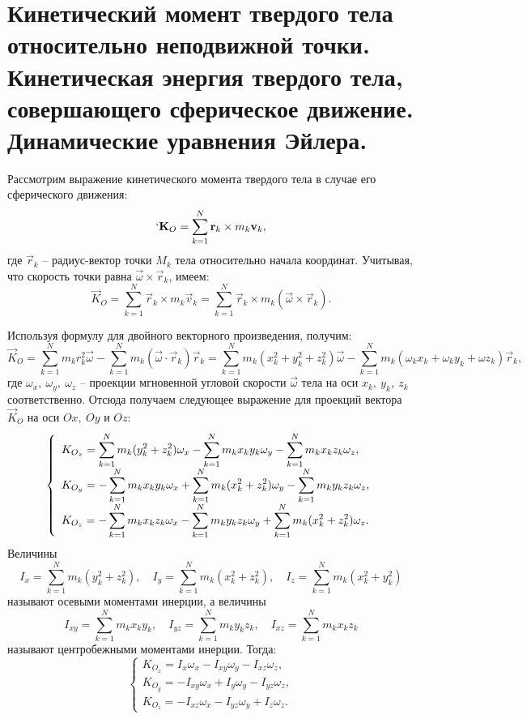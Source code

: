 \chapter{Кинетический момент твердого тела относительно неподвижной точки.
Кинетическая энергия твердого тела, совершающего сферическое движение.
Динамические уравнения Эйлера.}

Рассмотрим выражение кинетического момента твердого тела в случае его
сферического движения:
\[
`\vec{K}_O = \sum_{k=1}^N\vec{r}_k\times m_k\vec{v}_k,
\]
где \( \vec{r}_k \) -- радиус-вектор точки \( M_k \) тела относительно начала
координат. Учитывая, что скорость точки равна \( \vec{\omega}\times\vec{r}_k \),
имеем:
\[
    \vec{K}_O = \sum_{k=1}^N\vec{r}_k\times m_k\vec{v}_k =
    \sum_{k=1}^N \vec{r}_k\times m_k(\vec{\omega}\times\vec{r}_k).
\]

Используя формулу для двойного векторного произведения, получим:
\[
    \vec{K}_O = \sum_{k=1}^N m_k r_k^2\vec{\omega} - \sum_{k=1}^N m_k
    (\vec{\omega}\cdot\vec{r}_k)\vec{r}_k = \sum_{k=1}^N m_k(x_k^2 + y_k^2 +
    z_k^2)\vec{\omega} - \sum_{k=1}^N m_k (\omega_k x_k + \omega_k y_k + \omega
    z_k)\vec{r}_k,
\]
где \( \omega_x,\ \omega_y,\ \omega_z \) -- проекции мгновенной угловой скорости
\( \vec{\omega} \) тела на оси \( x_k,\ y_k,\ z_k \) соответственно. Отсюда
получаем следующее выражение для проекций вектора \( \vec{K}_O \) на оси
\( Ox,\ Oy \) и \( Oz \):
\[
    \left\{ \begin{array}{l}
        \ds K_{O_x} = \sum_{k=1}^N m_k(y_k^2 + z_k^2)\omega_x - \sum_{k=1}^N m_k
        x_k y_k \omega_y - \sum_{k=1}^N m_k x_k z_k \omega_z, \\[.4em]
        \ds K_{O_y} = -\sum_{k=1}^N m_k x_k y_k \omega_x + \sum_{k=1}^N m_k
        (x_k^2 + z_k^2)\omega_y  - \sum_{k=1}^N m_k y_k z_k \omega_z, \\[.4em]
        \ds K_{O_z} = -\sum_{k=1}^N m_k x_k z_k \omega_x - \sum_{k=1}^N m_k y_k
        z_k \omega_y + \sum_{k=1}^N m_k (x_k^2 + z_k^2)\omega_z.
    \end{array} \right.
\]
Величины
\[
    I_x = \sum_{k=1}^N m_k(y_k^2 + z_k^2), \quad I_y = \sum_{k=1}^N m_k(x_k^2 +
    z_k^2), \quad I_z = \sum_{k=1}^N m_k(x_k^2 + y_k^2)
\]
называют осевыми моментами инерции, а величины
\[
    I_{xy} = \sum_{k=1}^N m_k x_k y_k, \quad I_{yz} = \sum_{k=1}^N m_k y_k z_k,
    \quad I_{xz} = \sum_{k=1}^N m_k x_k z_k
\]
называют центробежными моментами инерции. Тогда:
\[
    \left\{ \begin{array}{l}
        K_{O_x} = I_x\omega_x - I_{xy}\omega_y - I_{xz}\omega_z, \\
        K_{O_y} = -I_{xy}\omega_x + I_y\omega_y  - I_{yz}\omega_z, \\
        K_{O_z} = -I_{xz}\omega_x - I_{yz}\omega_y + I_z\omega_z.
    \end{array} \right.
\]

